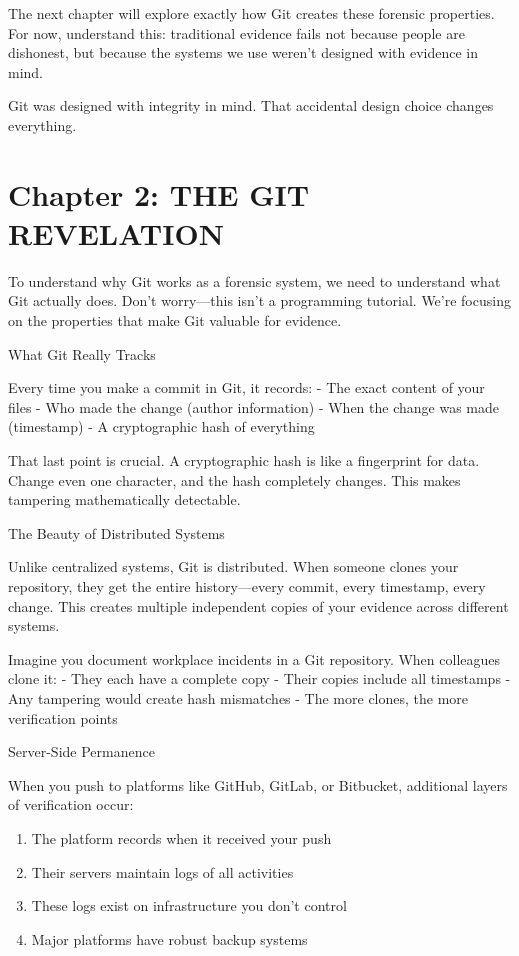The next chapter will explore exactly how Git creates these forensic
properties. For now, understand this: traditional evidence fails not
because people are dishonest, but because the systems we use weren't
designed with evidence in mind.

Git was designed with integrity in mind. That accidental design choice
changes everything.

\section{Chapter 2: THE GIT
REVELATION}\label{chapter-2-the-git-revelation}

To understand why Git works as a forensic system, we need to understand
what Git actually does. Don't worry---this isn't a programming tutorial.
We're focusing on the properties that make Git valuable for evidence.

What Git Really Tracks

Every time you make a commit in Git, it records: - The exact content of
your files - Who made the change (author information) - When the change
was made (timestamp) - A cryptographic hash of everything

That last point is crucial. A cryptographic hash is like a fingerprint
for data. Change even one character, and the hash completely changes.
This makes tampering mathematically detectable.

The Beauty of Distributed Systems

Unlike centralized systems, Git is distributed. When someone clones your
repository, they get the entire history---every commit, every timestamp,
every change. This creates multiple independent copies of your evidence
across different systems.

Imagine you document workplace incidents in a Git repository. When
colleagues clone it: - They each have a complete copy - Their copies
include all timestamps - Any tampering would create hash mismatches -
The more clones, the more verification points

Server-Side Permanence

When you push to platforms like GitHub, GitLab, or Bitbucket, additional
layers of verification occur:

\begin{enumerate}
\def\labelenumi{\arabic{enumi}.}
\tightlist
\item
  The platform records when it received your push
\item
  Their servers maintain logs of all activities
\item
  These logs exist on infrastructure you don't control
\item
  Major platforms have robust backup systems
\end{enumerate}

